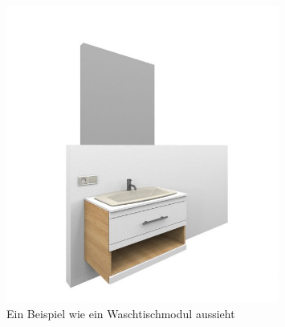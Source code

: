 \begin{figure}[h]
    \centering
    \includegraphics[width=0.8\textwidth]{images/Modul-Waschtisch-600x652.jpg}
    \caption{Ein Beispiel wie ein Waschtischmodul aussieht \cite{SanMOD}}
    \label{}
\end{figure}    
